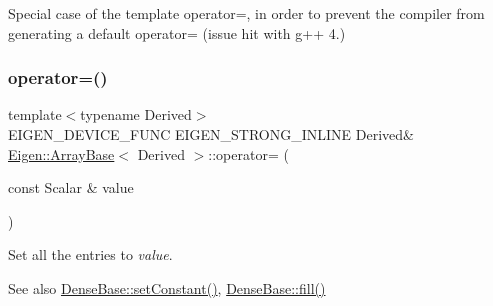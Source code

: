 Special case of the template operator=, in order to prevent the compiler from generating a default operator= (issue hit with g++ 4.) \mbox{\label{class_eigen_1_1_array_base_aff99276e139d767dbe3bcb360d5710a3}} 
\subsubsection{\texorpdfstring{operator=()}{operator=()}\hspace{0.1cm}{\footnotesize\ttfamily [5/5]}}
{\footnotesize\ttfamily template$<$typename Derived$>$ \\
E\+I\+G\+E\+N\+\_\+\+D\+E\+V\+I\+C\+E\+\_\+\+F\+U\+NC E\+I\+G\+E\+N\+\_\+\+S\+T\+R\+O\+N\+G\+\_\+\+I\+N\+L\+I\+NE Derived\& \mbox{\hyperlink{class_eigen_1_1_array_base}{Eigen\+::\+Array\+Base}}$<$ Derived $>$\+::operator= (\begin{DoxyParamCaption}\item[{const Scalar \&}]{value }\end{DoxyParamCaption})\hspace{0.3cm}{\ttfamily [inline]}}

Set all the entries to {\itshape value}. \begin{DoxySeeAlso}{See also}
\mbox{\hyperlink{class_eigen_1_1_dense_base_a19b2bc788277e9ab3f967a8857e290ae}{Dense\+Base\+::set\+Constant()}}, \mbox{\hyperlink{class_eigen_1_1_dense_base_a4f5eb49e80db57f79a8353ecdf811418}{Dense\+Base\+::fill()}} 
\end{DoxySeeAlso}
\mbox{\label{class_eigen_1_1_array_base_ad60a45873218a2346fe88caa300b1733}} 
